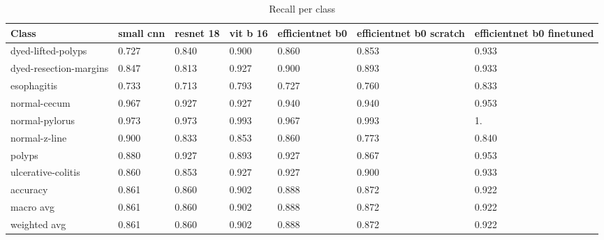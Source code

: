 \documentclass[conference]{IEEEtran}
\begin{document}
\begin{table}[ht]
\caption{Recall per class}
\begin{center}
\begin{tabular}{|m{4em}|m{2em}|m{2em}|m{1.8em}|m{4em}|m{4em}|m{4em}|}
\hline
\textbf{Class}&small cnn & resnet 18 & vit b 16 & efficientnet b0 & efficientnet b0 scratch & efficientnet b0 finetuned\\
\hline
dyed-lifted-polyps & 0.727 & 0.840 & 0.900 & 0.860 & 0.853 & 0.933 \\
dyed-resection-margins & 0.847 & 0.813 & 0.927 & 0.900 & 0.893 & 0.933 \\
esophagitis & 0.733 & 0.713 & 0.793 & 0.727 & 0.760 & 0.833 \\
normal-cecum & 0.967 & 0.927 & 0.927 & 0.940 & 0.940 & 0.953 \\
normal-pylorus & 0.973 & 0.973 & 0.993 & 0.967 & 0.993 & 1. \\
normal-z-line & 0.900 & 0.833 & 0.853 & 0.860 & 0.773 & 0.840 \\
polyps & 0.880 & 0.927 & 0.893 & 0.927 & 0.867 & 0.953 \\
ulcerative-colitis & 0.860 & 0.853 & 0.927 & 0.927 & 0.900 & 0.933 \\
accuracy & 0.861 & 0.860 & 0.902 & 0.888 & 0.872 & 0.922 \\
macro avg & 0.861 & 0.860 & 0.902 & 0.888 & 0.872 & 0.922 \\
weighted avg & 0.861 & 0.860 & 0.902 & 0.888 & 0.872 & 0.922 \\
\hline
\end{tabular}
\label{tables:tab6}
\end{center}
\end{table}
\end{document}
